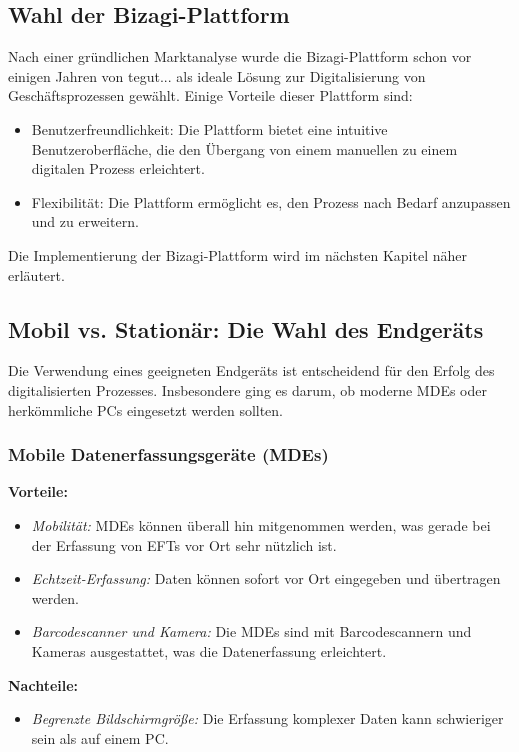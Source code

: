 \documentclass[12pt, a4paper]{article}
\begin{document}
\subsection{Wahl der Bizagi-Plattform}

Nach einer gründlichen Marktanalyse wurde die Bizagi-Plattform schon vor einigen Jahren von tegut... als ideale Lösung zur Digitalisierung von Geschäftsprozessen gewählt. 
Einige Vorteile dieser Plattform sind:
\begin{itemize}
\item Benutzerfreundlichkeit: Die Plattform bietet eine intuitive Benutzeroberfläche, die den Übergang von einem manuellen zu einem digitalen Prozess erleichtert.
\item Flexibilität: Die Plattform ermöglicht es, den Prozess nach Bedarf anzupassen und zu erweitern.
\end{itemize}
Die Implementierung der Bizagi-Plattform wird im nächsten Kapitel näher erläutert.

\subsection{Mobil vs. Stationär: Die Wahl des Endgeräts}

Die Verwendung eines geeigneten Endgeräts ist entscheidend für den Erfolg des digitalisierten Prozesses. Insbesondere ging es darum, ob moderne MDEs oder herkömmliche PCs eingesetzt werden sollten.

\subsubsection{Mobile Datenerfassungsgeräte (MDEs)}

\textbf{Vorteile:}
\begin{itemize}
\item \textit{Mobilität:} MDEs können überall hin mitgenommen werden, was gerade bei der Erfassung von EFTs vor Ort sehr nützlich ist.
\item \textit{Echtzeit-Erfassung:} Daten können sofort vor Ort eingegeben und übertragen werden.
\item \textit{Barcodescanner und Kamera:} Die MDEs sind mit Barcodescannern und Kameras ausgestattet, was die Datenerfassung erleichtert.
\end{itemize}

\textbf{Nachteile:}
\begin{itemize}
\item \textit{Begrenzte Bildschirmgröße:} Die Erfassung komplexer Daten kann schwieriger sein als auf einem PC.
\end{itemize}
\end{document}
